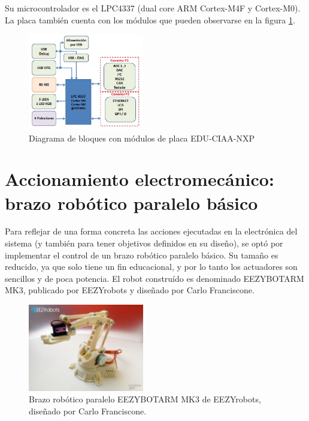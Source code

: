 \documentclass{IEEEtran}
\begin{document}
Su microcontrolador es el LPC4337 (dual core ARM Cortex-M4F y Cortex-M0). La placa también cuenta con los módulos que pueden observarse en la figura \ref{fig:edu-ciaa-modulos}.

\begin{figure}[ht]
    \centering
    \includegraphics[width=0.45\textwidth]{../modulos_edu_ciaa.jpg}
    \caption{Diagrama de bloques con módulos de placa EDU-CIAA-NXP}
    \label{fig:edu-ciaa-modulos}
\end{figure}

\section{Accionamiento electromecánico: brazo robótico paralelo básico}
Para reflejar de una forma concreta las acciones ejecutadas en la electrónica del sistema (y también para tener objetivos definidos en su diseño), se optó por implementar el control de un brazo robótico paralelo básico. Su tamaño es reducido, ya que solo tiene un fin educacional, y por lo tanto los actuadores son sencillos y de poca potencia. El robot construído es denominado EEZYBOTARM MK3, publicado por EEZYrobots y diseñado por Carlo Franciscone. 

\begin{figure}[ht]
    \centering
    \includegraphics[width=0.45\textwidth]{../robot_arm.jpg}
    \caption{Brazo robótico paralelo EEZYBOTARM MK3 de EEZYrobots, diseñado por Carlo Franciscone.}
    \label{fig:robot-arm}
\end{figure}
\end{document}

